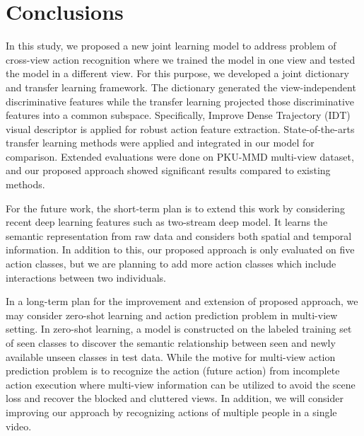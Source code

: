 \chapter{Conclusions}
\label{conclusion}
In this study, we proposed a new joint learning model to address problem of cross-view action recognition where we trained the model in one view and tested the model in a different view. For this purpose, we developed a joint dictionary and transfer learning framework. The dictionary generated the view-independent discriminative features while the transfer learning projected those discriminative features into a common subspace. Specifically, Improve Dense Trajectory (IDT) visual descriptor is applied for robust action feature extraction. State-of-the-arts transfer learning methods were applied and integrated in our model for comparison. Extended evaluations were done on PKU-MMD multi-view dataset, and our proposed approach showed significant results compared to existing methods.

For the future work, the short-term plan is to extend this work by considering recent deep learning features such as two-stream deep model. It learns the semantic representation from raw data and considers both spatial and temporal information. In addition to this, our proposed approach is only evaluated on five action classes, but we are planning to add more action classes which include interactions between two individuals.
 
In a long-term plan for the improvement and extension of proposed approach, we may consider zero-shot learning and action prediction problem in multi-view setting. In zero-shot learning, a model is constructed on the labeled training set of seen classes to discover the semantic relationship between seen and newly available unseen classes in test data. While the motive for multi-view action prediction problem is to recognize the action (future action) from incomplete action execution where multi-view information can be utilized to avoid the scene loss and recover the blocked and cluttered views. In addition, we will consider improving our approach by recognizing actions of multiple people in a single video.




